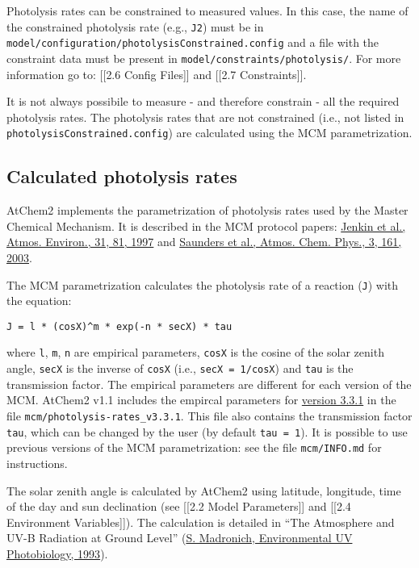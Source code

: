 Photolysis rates can be constrained to measured values. In this case,
the name of the constrained photolysis rate (e.g., \texttt{J2}) must
be in \texttt{model/configuration/photolysisConstrained.config} and a
file with the constraint data must be present in
\texttt{model/constraints/photolysis/}. For more information go to:
{[}{[}2.6 Config Files{]}{]} and {[}{[}2.7 Constraints{]}{]}.

It is not always possibile to measure - and therefore constrain - all
the required photolysis rates. The photolysis rates that are not
constrained (i.e., not listed in
\texttt{photolysisConstrained.config}) are calculated using the MCM
parametrization.

\subsection{Calculated photolysis rates} \label{subsec:calculated-photolysis-rates}

AtChem2 implements the parametrization of photolysis rates used by the
Master Chemical Mechanism. It is described in the MCM protocol papers:
\href{https://doi.org/10.1016/S1352-2310(96)00105-7}{Jenkin et al.,
  Atmos. Environ., 31, 81, 1997} and
\href{https://doi.org/10.5194/acp-3-161-2003}{Saunders et al., Atmos.
  Chem. Phys., 3, 161, 2003}.

The MCM parametrization calculates the photolysis rate of a reaction
(\texttt{J}) with the equation:

\begin{verbatim}
J = l * (cosX)^m * exp(-n * secX) * tau
\end{verbatim}

where \texttt{l}, \texttt{m}, \texttt{n} are empirical parameters,
\texttt{cosX} is the cosine of the solar zenith angle, \texttt{secX}
is the inverse of \texttt{cosX} (i.e., \texttt{secX\ =\ 1/cosX}) and
\texttt{tau} is the transmission factor. The empirical parameters are
different for each version of the MCM. AtChem2 v1.1 includes the
empircal parameters for
\href{http://mcm.leeds.ac.uk/MCM/parameters/photolysis_param.htt}{version
  3.3.1} in the file \texttt{mcm/photolysis-rates\_v3.3.1}. This file
also contains the transmission factor \texttt{tau}, which can be
changed by the user (by default \texttt{tau\ =\ 1}). It is possible to
use previous versions of the MCM parametrization: see the file
\texttt{mcm/INFO.md} for instructions.

The solar zenith angle is calculated by AtChem2 using latitude,
longitude, time of the day and sun declination (see {[}{[}2.2 Model
Parameters{]}{]} and {[}{[}2.4 Environment Variables{]}{]}). The
calculation is detailed in ``The Atmosphere and UV-B Radiation at
Ground Level'' (\href{https://doi.org//10.1007/978-1-4899-2406-3_1}{S.
  Madronich, Environmental UV Photobiology, 1993}).

